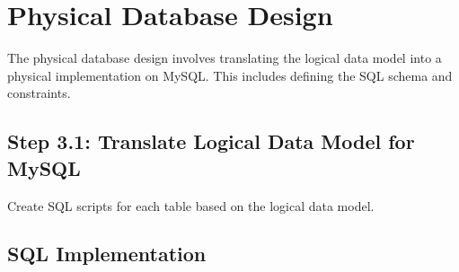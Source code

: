 \documentclass[a4paper,12pt]{article}
\begin{document}
\newpage

\section*{Physical Database Design}
The physical database design involves translating the logical data model into a physical implementation on MySQL. This includes defining the SQL schema and constraints.

\subsection*{Step 3.1: Translate Logical Data Model for MySQL}
Create SQL scripts for each table based on the logical data model.

\subsection*{SQL Implementation}
\end{document}
